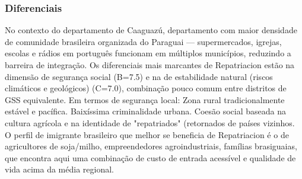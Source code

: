 \subsubsection*{Diferenciais}\label{dif-repatriacion-0507}
No contexto do departamento de Caaguazú, departamento com maior densidade de comunidade brasileira organizada do Paraguai — supermercados, igrejas, escolas e rádios em português funcionam em múltiplos municípios, reduzindo a barreira de integração. Os diferenciais mais marcantes de Repatriacion estão na dimensão de segurança social (B=7.5) e na de estabilidade natural (riscos climáticos e geológicos) (C=7.0), combinação pouco comum entre distritos de GSS equivalente. Em termos de segurança local: Zona rural tradicionalmente estável e pacífica. Baixíssima criminalidade urbana. Coesão social baseada na cultura agrícola e na identidade de "repatriados" (retornados de países vizinhos. O perfil de imigrante brasileiro que melhor se beneficia de Repatriacion é o de agricultores de soja/milho, empreendedores agroindustriais, famílias brasiguaias, que encontra aqui uma combinação de custo de entrada acessível e qualidade de vida acima da média regional.

